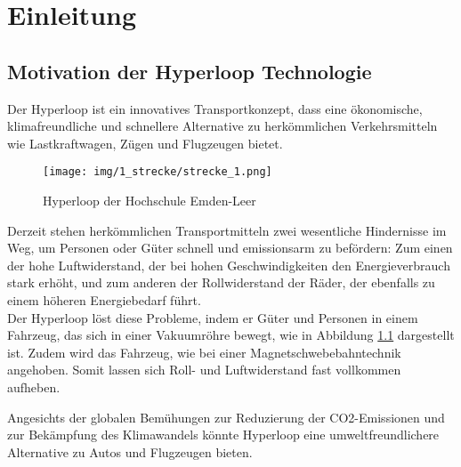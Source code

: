 \chapter{Einleitung}
\label{chapter:Einleitung}

\section{Motivation der Hyperloop Technologie}
\label{section:Motivation}

Der Hyperloop ist ein innovatives Transportkonzept, dass eine ökonomische, klimafreundliche und schnellere Alternative zu herkömmlichen Verkehrsmitteln wie Lastkraftwagen, Zügen und Flugzeugen bietet.\\
\pagebreak[3]
\begin{figure}[!ht]
	\begin{center}
		\texttt{[image: img/1\_strecke/strecke\_1.png]}
		\caption{Hyperloop der Hochschule Emden-Leer}
		\label{img_1_1:strecke}
	\end{center}
\end{figure}
\pagebreak[4]
Derzeit stehen herkömmlichen Transportmitteln zwei wesentliche Hindernisse im Weg, um Personen oder Güter schnell und emissionsarm zu befördern: Zum einen der hohe Luftwiderstand, der bei hohen Geschwindigkeiten den Energieverbrauch stark erhöht, und zum anderen der Rollwiderstand der Räder, der ebenfalls zu einem höheren Energiebedarf führt.\\


Der Hyperloop löst diese Probleme, indem er Güter und Personen in einem Fahrzeug, das sich in einer Vakuumröhre bewegt, wie in Abbildung \ref{img_1_1:strecke} dargestellt ist. Zudem wird das Fahrzeug, wie bei einer Magnetschwebebahntechnik angehoben. Somit lassen sich Roll- und Luftwiderstand fast vollkommen aufheben.

Angesichts der globalen Bemühungen zur Reduzierung der CO2-Emissionen und zur Bekämpfung des Klimawandels könnte Hyperloop eine umweltfreundlichere Alternative zu Autos und Flugzeugen bieten.





